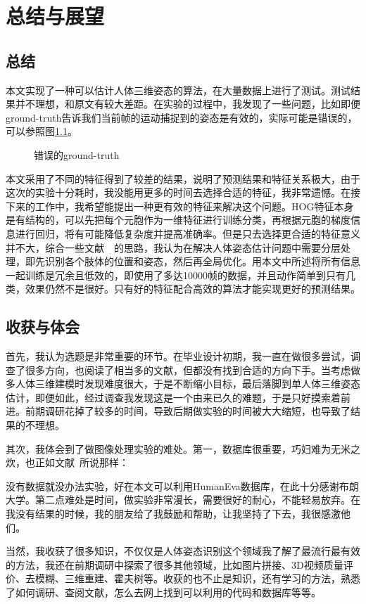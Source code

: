 

\chapter{总结与展望}
\section{总结}
本文实现了一种可以估计人体三维姿态的算法，在大量数据上进行了测试。测试结果并不理想，和原文有较大差距。在实验的过程中，我发现了一些问题，比如即便ground-truth告诉我们当前帧的运动捕捉到的姿态是有效的，实际可能是错误的，可以参照图\ref{fig:wrong}。
\begin{figure}[H]
  \centering
  \caption{错误的ground-truth}\label{fig:wrong}
\end{figure}

本文采用了不同的特征得到了较差的结果，说明了预测结果和特征关系极大，由于这次的实验十分耗时，我没能用更多的时间去选择合适的特征，我非常遗憾。在接下来的工作中，我希望能提出一种更有效的特征来解决这个问题。HOG特征本身是有结构的，可以先把每个元胞作为一维特征进行训练分类，再根据元胞的梯度信息进行回归，将有可能降低复杂度并提高准确率。但是只去选择更合适的特征意义并不大，综合一些文献~\cite{ramanan2007learning}~\cite{yang2011articulated}的思路，我认为在解决人体姿态估计问题中需要分层处理，即先识别各个肢体的位置和姿态，然后再全局优化。用本文中所述将所有信息一起训练是冗余且低效的，即使用了多达10000帧的数据，并且动作简单到只有几类，效果仍然不是很好。只有好的特征配合高效的算法才能实现更好的预测结果。

\section{收获与体会}
首先，我认为选题是非常重要的环节。在毕业设计初期，我一直在做很多尝试，调查了很多方向，也阅读了相当多的文献，但都没有找到合适的方向下手。当考虑做多人体三维建模时发现难度很大，于是不断缩小目标，最后落脚到单人体三维姿态估计，即便如此，经过调查我发现这是一个由来已久的难题，于是只好摸索着前进。前期调研花掉了较多的时间，导致后期做实验的时间被大大缩短，也导致了结果的不理想。

其次，我体会到了做图像处理实验的难处。第一，数据库很重要，巧妇难为无米之炊，也正如文献~\cite{gkiox2013ariarticulated}所说那样：\\
\begin{center}
\end{center}
没有数据就没办法实验，好在本文可以利用HumanEva数据库，在此十分感谢布朗大学。第二点难处是时间，做实验非常漫长，需要很好的耐心，不能轻易放弃。在我没有结果的时候，我的朋友给了我鼓励和帮助，让我坚持了下去，我很感激他们。

当然，我收获了很多知识，不仅仅是人体姿态识别这个领域我了解了最流行最有效的方法，我还在前期调研中探索了很多其他领域，比如图片拼接、3D视频质量评价、去模糊、三维重建、霍夫树等。收获的也不止是知识，还有学习的方法，熟悉了如何调研、查阅文献，怎么去网上找到可以利用的代码和数据库等等。 